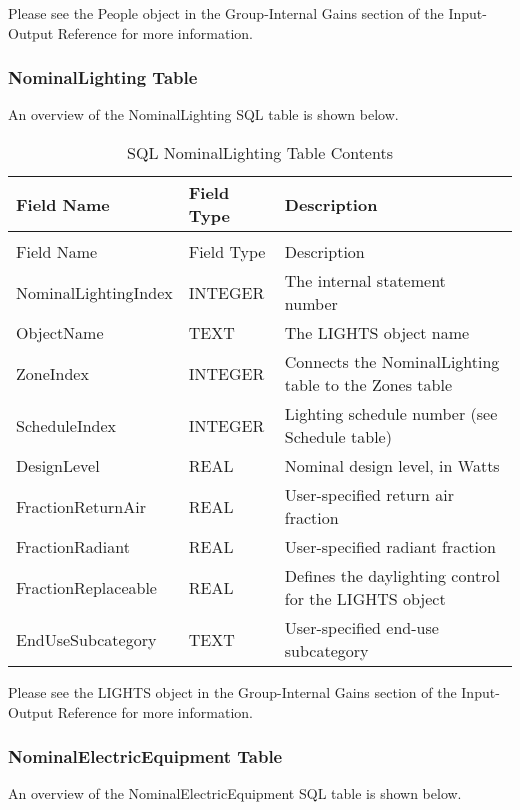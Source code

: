 Please see the People object in the Group-Internal Gains section of the Input-Output Reference for more information.

\subsubsection{NominalLighting Table}

An overview of the NominalLighting SQL table is shown below.

\begin{longtable}[c]{p{1.5in}p{1.5in}p{3.0in}}
\caption{SQL NominalLighting Table Contents \label{table:table-16.-sql-nominallighting-table-contents}} \tabularnewline
\toprule 
Field Name & Field Type & Description \tabularnewline
\midrule
\endfirsthead

\caption[]{SQL NominalLighting Table Contents} \tabularnewline
\toprule 
Field Name & Field Type & Description \tabularnewline
\midrule
\endhead

NominalLightingIndex & INTEGER & The internal statement number \tabularnewline
ObjectName & TEXT & The LIGHTS object name \tabularnewline
ZoneIndex & INTEGER & Connects the NominalLighting table to the Zones table \tabularnewline
ScheduleIndex & INTEGER & Lighting schedule number (see Schedule table) \tabularnewline
DesignLevel & REAL & Nominal design level, in Watts \tabularnewline
FractionReturnAir & REAL & User-specified return air fraction \tabularnewline
FractionRadiant & REAL & User-specified radiant fraction \tabularnewline
FractionReplaceable & REAL & Defines the daylighting control for the LIGHTS object \tabularnewline
EndUseSubcategory & TEXT & User-specified end-use subcategory \tabularnewline
\bottomrule
\end{longtable}

Please see the LIGHTS object in the Group-Internal Gains section of the Input-Output Reference for more information.

\subsubsection{NominalElectricEquipment Table}

An overview of the NominalElectricEquipment SQL table is shown below.

